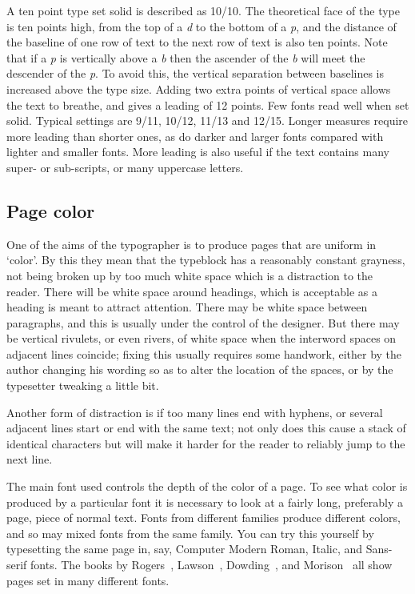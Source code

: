 \documentclass[10pt,letterpaper,extrafontsizes]{memoir}
\begin{document}
    A ten point type set solid is described as 10/10. The theoretical
face of the type is ten points high, from the top of a \emph{d} to the bottom
of a \emph{p}, and the distance of the baseline of one row of text to the
next row of text is also ten points. Note that if a \emph{p} is vertically
above a \emph{b} then the ascender of the \emph{b} will meet the descender
of the \emph{p}. To avoid this, the vertical separation between baselines 
is increased above the type size. Adding two extra points of vertical space
allows the text to breathe, and gives a leading of 12 points. Few fonts
read well when set solid. Typical settings are 9/11, 10/12, 11/13 and 12/15.
Longer measures require more leading than shorter ones, as do darker 
and larger
fonts compared with lighter and smaller fonts. More leading is also
useful if the text contains many super- or 
sub-scripts, or many uppercase letters.



\subsection{Page color}

    One of the aims of the typographer is to produce pages that are uniform
in `color'. By this they mean that the 
typeblock has a reasonably constant
grayness, not being broken up by too much white space which is a distraction
to the reader. There will be white space around headings, 
which is acceptable as a heading is meant to attract attention. 
There may be white space between paragraphs, and this is 
usually under the control of the designer. But there 
may be vertical rivulets, or even rivers, of white space when the 
interword spaces on adjacent lines coincide; fixing this usually 
requires some handwork, either
by the author changing his wording so as to alter the location of
the spaces, or by the typesetter tweaking a little bit. 

    Another form of distraction is if too many lines end with hyphens, or
several adjacent lines start or end with the same text; not only does
this cause a stack of identical characters but will make it harder for 
the reader to reliably jump to the next line.

    The main font used controls the depth of the color of a page. To
see what color is produced by a particular font it is necessary to look
at a fairly long, preferably a page, piece of normal text. Fonts from
different families produce different colors, and so may mixed fonts from 
the same family. You can try this yourself by typesetting the same page
in, say, Computer Modern Roman, Italic, and Sans-serif fonts.
The books by Rogers~\autocite{ROGERS43}, Lawson~\autocite{LAWSON90},
Dowding~\autocite{DOWDING98}, and 
Morison~\autocite{MORISON99} all show pages set in many different fonts.
\end{document}
